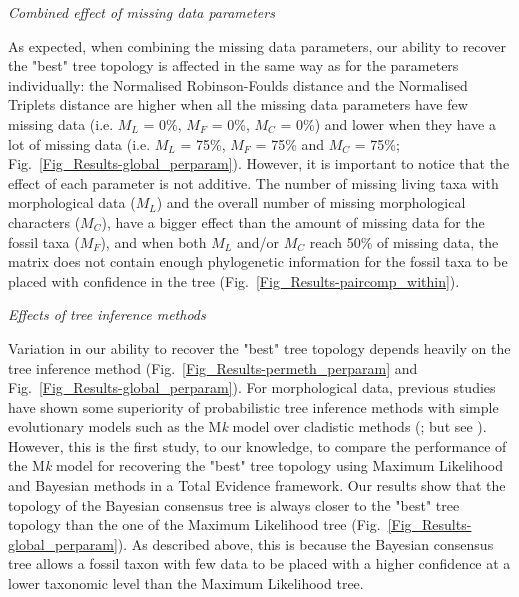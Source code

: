 \documentclass[12pt,letterpaper]{article}
\renewcommand{\subsection}[1]{%
\bigskip
\begin{center}
\begin{large}
\normalfont\itshape #1
\end{large}
\end{center}}
\begin{document}
\subsection{Combined effect of missing data parameters}
As expected, when combining the missing data parameters, our ability to recover the "best" tree topology is affected in the same way as for the parameters individually: the Normalised Robinson-Foulds distance and the Normalised Triplets distance are higher when all the missing data parameters have few missing data (i.e. $M_{L}$ = 0\%, $M_{F}$ = 0\%, $M_{C}$ = 0\%) and lower when they have a lot of missing data (i.e. $M_{L}$ = 75\%, $M_{F}$ = 75\% and $M_{C}$ = 75\%; Fig.~\ref{Fig_Results-global_perparam}). However, it is important to notice that the effect of each parameter is not additive. The number of missing living taxa with morphological data ($M_{L}$) and the overall number of missing morphological characters ($M_{C}$), have a bigger effect than the amount of missing data for the fossil taxa ($M_{F}$), and when both $M_{L}$ and/or $M_{C}$ reach 50\% of missing data, the matrix does not contain enough phylogenetic information for the fossil taxa to be placed with confidence in the tree (Fig.~\ref{Fig_Results-paircomp_within}).

\subsection{Effects of tree inference methods}
Variation in our ability to recover the "best" tree topology depends heavily on the tree inference method (Fig.~\ref{Fig_Results-permeth_perparam} and Fig.~\ref{Fig_Results-global_perparam}). For morphological data, previous studies have shown some superiority of probabilistic tree inference methods with simple evolutionary models such as the M\textit{k} model \citep{lewisa2001} over cladistic methods (\citealt{wrightbayesian2014}; but see \citealt{spencerefficacy2013}). However, this is the first study, to our knowledge, to compare the performance of the M\textit{k} model \citep{lewisa2001} for recovering the "best" tree topology using Maximum Likelihood and Bayesian methods in a Total Evidence framework. Our results show that the topology of the Bayesian consensus tree is always closer to the "best" tree topology than the one of the Maximum Likelihood tree (Fig.~\ref{Fig_Results-global_perparam}). As described above, this is because the Bayesian consensus tree allows a fossil taxon with few data to be placed with a higher confidence at a lower taxonomic level than the Maximum Likelihood tree. 
\end{document}
